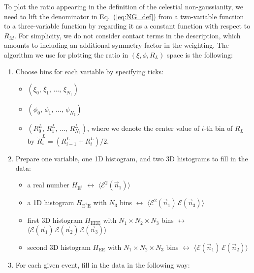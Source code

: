 \documentclass[letterpaper,11pt]{article}
\DeclareRobustCommand{\Eq}[1]{Eq.~(\ref{#1})}
\begin{document}
To plot the ratio appearing in the definition of the celestial non-gaussianity, we need to lift the denominator in \Eq{eq:NG_def} from a two-variable function to a three-variable function by regarding it as a constant function with respect to $R_M$.
%
For simplicity, we do not consider contact terms in the description, which amounts to including an additional symmetry factor in the weighting.
%
The algorithm we use for plotting the ratio in $(\xi, \phi, R_L)$ space is the following:  
%
\begin{enumerate}
\def\labelenumi{\arabic{enumi}.}
\item
  Choose bins for each variable by specifying ticks:

  \begin{itemize}
  \item
    \((\xi_0,\, \xi_1,\, \dots ,\, \xi_{N_1})\)
  \item
    \((\phi_0,\, \phi_1,\, \dots ,\, \phi_{N_2})\)
  \item
    \((R^L_0,\, R^L_1,\, \dots ,\, R^L_{N_3})\), where we denote the center value of \(i\)-th bin of \(R_L\) by
    \(\widetilde{R}^L_i = (R^L_{i-1} + R^L_i)/2\).
  \end{itemize}
\item
  Prepare one variable, one 1D histogram, and two 3D histograms to fill
  in the data:
%
  \begin{itemize}
  \item
    a real number \(H_{\mathrm{E}^2}\) \(\leftrightarrow\)
    \(\langle\mathcal{E}^2(\vec{n}_1)\rangle\)
  \item
    a 1D histogram \(H_{\mathrm{E^2E}}\) with \(N_3\) bins
    \(\leftrightarrow\)
    \(\langle\mathcal{E}^2(\vec{n}_1)\,\mathcal{E}(\vec{n}_3)\rangle\)
  \item
    first 3D histogram \(H_{\mathrm{EEE}}\) with
    \(N_1\times N_2\times N_3\) bins \(\leftrightarrow\)
    \(\langle\mathcal{E}(\vec{n}_1)\, \mathcal{E}(\vec{n}_2)\,\mathcal{E}(\vec{n}_3)\rangle\)
  \item
    second 3D histogram \(H_{\mathrm{EE}}\) with
    \(N_1\times N_2\times N_3\) bins \(\leftrightarrow\)
    \(\langle\mathcal{E}(\vec{n}_1)\,\mathcal{E}(\vec{n}_2)\rangle\)
  \end{itemize}
\item
  For each given event, fill in the data in the following way:


\end{enumerate}
\end{document}
